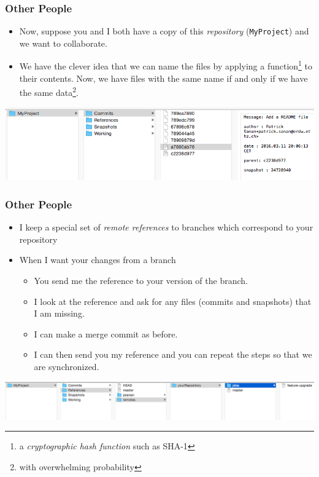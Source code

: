 \documentclass{beamer}
\begin{document}
\begin{frame}[fragile]
\frametitle{Other People}
\begin{itemize}
\item Now, suppose you and I both have a copy of this \emph{repository} (\texttt{MyProject}) and we want to collaborate.
\item We have the clever idea that we can name the files by applying a function\footnote{a \emph{cryptographic hash function} such as SHA-1} to their contents. Now, we have files with the same name if and only if we have the same data\footnote{with overwhelming probability}.
\end{itemize}
\includegraphics[scale=0.4]{remote1.png}\\
\vspace{10px}
\end{frame}

\begin{frame}[fragile]
\frametitle{Other People}
\begin{itemize}
\item I keep a special set of \emph{remote references} to branches which correspond to your repository
\item When I want your changes from a branch
\begin{itemize}
\item You send me the reference to your version of the branch.
\item I look at the reference and ask for any files (commits and snapshots) that I am missing.
\item I can make a merge commit as before.
\item I can then send you my reference and you can repeat the steps so that we are synchronized.
\end{itemize}
\end{itemize}
\includegraphics[scale=0.3]{remote2.png}
\vspace{10px}
\end{frame}
\end{document}
